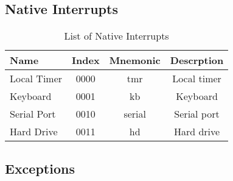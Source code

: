 \documentclass{article}
\begin{document}
    \subsection{Native Interrupts}
    
    \begin{table}[H]
    \centering
    \caption{List of Native Interrupts}
    \label{table:native_int}
    \begin{tabular}{|l|c|c|c|}
    
    \hline Name         & Index     & Mnemonic  & Descrption    \\
    \hline Local Timer  & 0000      & tmr       & Local timer \\
    \hline Keyboard     & 0001      & kb            & Keyboard \\
    \hline Serial Port  & 0010      & serial        & Serial port \\
    \hline Hard Drive   & 0011      & hd            & Hard drive \\

    \hline
    \end{tabular}
    \end{table}
    
    \subsection{Exceptions} 
    
\end{document}
